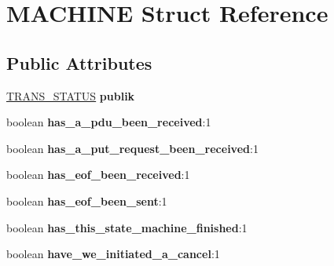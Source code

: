 \hypertarget{struct_m_a_c_h_i_n_e}{}\section{M\+A\+C\+H\+I\+NE Struct Reference}
\label{struct_m_a_c_h_i_n_e}
\subsection*{Public Attributes}
\begin{DoxyCompactItemize}
\item 
\hyperlink{struct_t_r_a_n_s___s_t_a_t_u_s}{T\+R\+A\+N\+S\+\_\+\+S\+T\+A\+T\+US} {\bfseries publik}\hypertarget{struct_m_a_c_h_i_n_e_a6c3d05a5a9281bec7b22605df99c08e8}{}\label{struct_m_a_c_h_i_n_e_a6c3d05a5a9281bec7b22605df99c08e8}

\item 
boolean {\bfseries has\+\_\+a\+\_\+pdu\+\_\+been\+\_\+received}\+:1\hypertarget{struct_m_a_c_h_i_n_e_ad4de08f39605e2f9e0ae9b842644397d}{}\label{struct_m_a_c_h_i_n_e_ad4de08f39605e2f9e0ae9b842644397d}

\item 
boolean {\bfseries has\+\_\+a\+\_\+put\+\_\+request\+\_\+been\+\_\+received}\+:1\hypertarget{struct_m_a_c_h_i_n_e_af6e7e6cd7219636d60aa319d214b02f1}{}\label{struct_m_a_c_h_i_n_e_af6e7e6cd7219636d60aa319d214b02f1}

\item 
boolean {\bfseries has\+\_\+eof\+\_\+been\+\_\+received}\+:1\hypertarget{struct_m_a_c_h_i_n_e_a791c795c9b8f94415bfef3e30f0cec42}{}\label{struct_m_a_c_h_i_n_e_a791c795c9b8f94415bfef3e30f0cec42}

\item 
boolean {\bfseries has\+\_\+eof\+\_\+been\+\_\+sent}\+:1\hypertarget{struct_m_a_c_h_i_n_e_ab4b8b566ffe5f9a843ed061f98803471}{}\label{struct_m_a_c_h_i_n_e_ab4b8b566ffe5f9a843ed061f98803471}

\item 
boolean {\bfseries has\+\_\+this\+\_\+state\+\_\+machine\+\_\+finished}\+:1\hypertarget{struct_m_a_c_h_i_n_e_a9f3d17df8d0b8d8c8051b9ad5f808a08}{}\label{struct_m_a_c_h_i_n_e_a9f3d17df8d0b8d8c8051b9ad5f808a08}

\item 
boolean {\bfseries have\+\_\+we\+\_\+initiated\+\_\+a\+\_\+cancel}\+:1\hypertarget{struct_m_a_c_h_i_n_e_a71b9a1432a405040140194f6bca1704a}{}\label{struct_m_a_c_h_i_n_e_a71b9a1432a405040140194f6bca1704a}


\end{DoxyCompactItemize}
